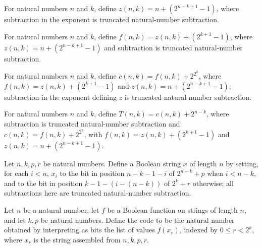 \begin{definition}
\label{BoolCircuit.Lupanov.oZ}
\leanok
For natural numbers $n$ and $k$, define $z(n,k)=n+(2^{n-k+1}-1)$, where subtraction in
the exponent is truncated natural-number subtraction.
\end{definition}

\begin{definition}
\label{BoolCircuit.Lupanov.oF}
\leanok
{}
For natural numbers $n$ and $k$, define $f(n,k)=z(n,k)+(2^{k+1}-1)$, where
$z(n,k)=n+(2^{n-k+1}-1)$ and subtraction is truncated natural-number subtraction.
\end{definition}

\begin{definition}
\label{BoolCircuit.Lupanov.oC}
\leanok
{}
For natural numbers $n$ and $k$, define $c(n,k)=f(n,k)+2^{2^k}$, where
$f(n,k)=z(n,k)+(2^{k+1}-1)$ and $z(n,k)=n+(2^{n-k+1}-1)$; subtraction in the exponent
defining $z$ is truncated natural-number subtraction.
\end{definition}

\begin{definition}
\label{BoolCircuit.Lupanov.total}
\leanok
{}
For natural numbers $n$ and $k$, define $T(n,k)=c(n,k)+2^{n-k}$, where subtraction is
truncated natural-number subtraction and $c(n,k)=f(n,k)+2^{2^k}$, with
$f(n,k)=z(n,k)+(2^{k+1}-1)$ and $z(n,k)=n+(2^{n-k+1}-1)$.
\end{definition}

\begin{definition}
\label{BoolCircuit.Lupanov.assemble}
\leanok
Let $n,k,p,r$ be natural numbers. Define a Boolean string $x$ of length $n$ by setting,
for each $i<n$, $x_i$ to the bit in position $n-k-1-i$ of $2^{n-k}+p$ when $i<n-k$, and
to the bit in position $k-1-(i-(n-k))$ of $2^k+r$ otherwise; all subtractions here are
truncated natural-number subtraction.
\end{definition}

\begin{definition}
\label{BoolCircuit.Lupanov.code}
\leanok
{}
Let $n$ be a natural number, let $f$ be a Boolean function on strings of length $n$, and
let $k,p$ be natural numbers. Define the code to be the natural number obtained by
interpreting as bits the list of values $f(x_r)$, indexed by $0\le r<2^k$, where $x_r$
is the string assembled from $n,k,p,r$.
\end{definition}

